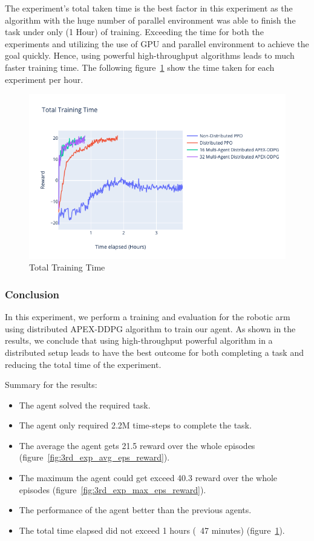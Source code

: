 The experiment's total taken time is the best factor in this experiment as the algorithm with the huge number of parallel environment was able to finish the task under only (1 Hour) of training. Exceeding the time for both the experiments and utilizing the use of GPU and parallel environment to achieve the goal quickly. Hence, using powerful high-throughput algorithms leads to much faster training time. The following figure~\ref{fig:3rd_exp_total_training_time} show the time taken for each experiment per hour.
\begin{figure}[!htb]
		\centering
		\includegraphics[width=\linewidth]{figures/exps/3rd_exp/total_training_time.png}
		\caption{Total Training Time}
		\label{fig:3rd_exp_total_training_time}
\end{figure}


\subsubsection{Conclusion}

In this experiment, we perform a training and evaluation for the robotic arm using distributed APEX-DDPG algorithm to train our agent. As shown in the results, we conclude that using high-throughput powerful algorithm in a distributed setup leads to have the best outcome for both completing a task and reducing the total time of the experiment.

Summary for the results:
\begin{itemize}
	\item The agent solved the required task.
	\item The agent only required 2.2M time-steps to complete the task.
	\item The average the agent gets 21.5 reward over the whole episodes (figure~\ref{fig:3rd_exp_avg_eps_reward}).
	\item The maximum the agent could get exceed 40.3 reward over the whole episodes (figure~\ref{fig:3rd_exp_max_eps_reward}).
	\item The performance of the agent better than the previous agents.
	\item The total time elapsed did not exceed 1 hours (~47 minutes) (figure~\ref{fig:3rd_exp_total_training_time}).
\end{itemize}